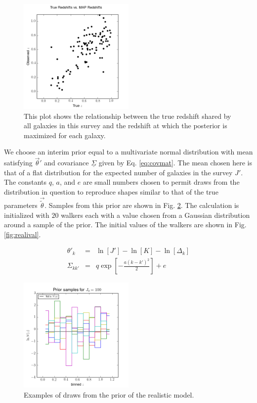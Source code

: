 \documentclass[preprint]{aastex}
\newcommand{\textul}{\underline}
\begin{document}
\begin{figure}
\includegraphics[width=0.5\textwidth]{real/truevmap.png}
\caption{This plot shows the relationship between the true redshift shared by all galaxies in this survey and the redshift at which the posterior is maximized for each galaxy.}
\label{fig:realcat}
\end{figure}

We choose an interim prior equal to a multivariate normal distribution with mean satisfying $\vec{\theta}'$ and covariance $\textul{\Sigma}$ given by Eq. \ref{eq:covmat}.  The mean chosen here is that of a flat distribution for the expected number of galaxies in the survey $J'$.  The constants $q$, $a$, and $e$ are small numbers chosen to permit draws from the distribution in question to reproduce shapes similar to that of the true parameters $\vec{\tilde{\theta}}$.  Samples from this prior are shown in Fig. \ref{fig:realprior}.  The calculation is initialized with $20$ walkers each with a value chosen from a Gaussian distribution around a sample of the prior.  The initial values of the walkers are shown in Fig. \ref{fig:realival}.

\begin{eqnarray}
\label{eq:covmat}
\theta'_{k} &=& \ln[J']-\ln[K]-\ln[\Delta_{k}]\\
\Sigma_{kk'} &=& q\exp\left[-\frac{a(k-k')^{2}}{2}\right]+e
\end{eqnarray}

\begin{figure}
\includegraphics[width=0.5\textwidth]{real/priorsamps.png}
\caption{Examples of draws from the prior of the realistic model.}
\label{fig:realprior}
\end{figure}
\end{document}
